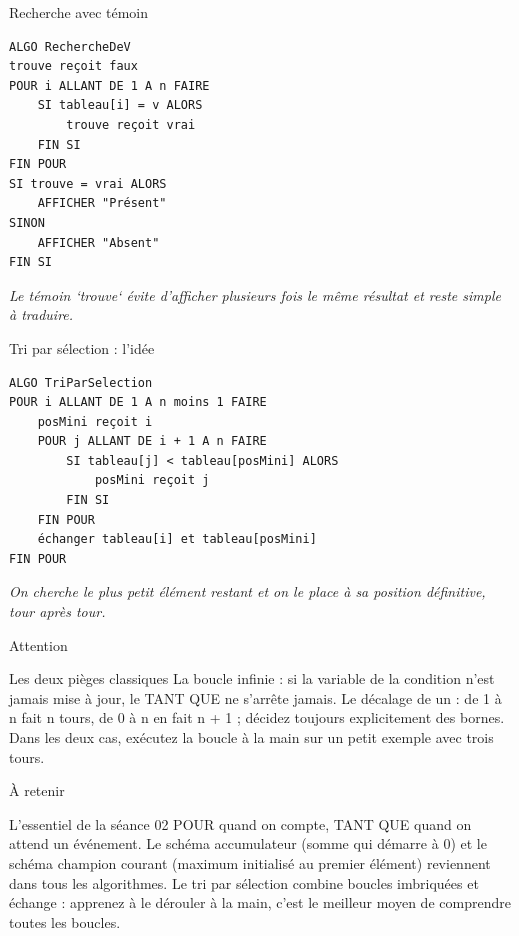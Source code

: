 \documentclass[aspectratio=169,11pt]{beamer}
\begin{document}
\begin{frame}[fragile]{Recherche avec témoin}

\begin{lstlisting}[style=py]
ALGO RechercheDeV
trouve reçoit faux
POUR i ALLANT DE 1 A n FAIRE
    SI tableau[i] = v ALORS
        trouve reçoit vrai
    FIN SI
FIN POUR
SI trouve = vrai ALORS
    AFFICHER "Présent"
SINON
    AFFICHER "Absent"
FIN SI
\end{lstlisting}
\vspace{0.5pt}

{\small\color{PyGris}\itshape Le témoin `trouve` évite d'afficher plusieurs fois le même résultat et reste simple à traduire.}

\end{frame}

\begin{frame}[fragile]{Tri par sélection : l'idée}

\begin{lstlisting}[style=py]
ALGO TriParSelection
POUR i ALLANT DE 1 A n moins 1 FAIRE
    posMini reçoit i
    POUR j ALLANT DE i + 1 A n FAIRE
        SI tableau[j] < tableau[posMini] ALORS
            posMini reçoit j
        FIN SI
    FIN POUR
    échanger tableau[i] et tableau[posMini]
FIN POUR
\end{lstlisting}
\vspace{0.5pt}

{\small\color{PyGris}\itshape On cherche le plus petit élément restant et on le place à sa position définitive, tour après tour.}

\end{frame}

\begin{frame}{Attention}
\begin{alertblock}{Les deux pièges classiques}
La boucle infinie : si la variable de la condition n'est jamais mise à jour, le TANT QUE ne s'arrête jamais. Le décalage de un : de 1 à n fait n tours, de 0 à n en fait n + 1 ; décidez toujours explicitement des bornes. Dans les deux cas, exécutez la boucle à la main sur un petit exemple avec trois tours.
\end{alertblock}
\end{frame}

\begin{frame}{À retenir}
\begin{block}{L'essentiel de la séance 02}
POUR quand on compte, TANT QUE quand on attend un événement. Le schéma accumulateur (somme qui démarre à 0) et le schéma champion courant (maximum initialisé au premier élément) reviennent dans tous les algorithmes. Le tri par sélection combine boucles imbriquées et échange : apprenez à le dérouler à la main, c'est le meilleur moyen de comprendre toutes les boucles.
\end{block}
\end{frame}
\end{document}
